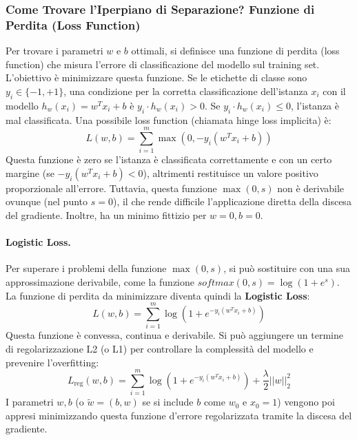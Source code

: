 \documentclass{article}
\begin{document}
\subsubsection{Come Trovare l'Iperpiano di Separazione? Funzione di Perdita (Loss Function)}
Per trovare i parametri $w$ e $b$ ottimali, si definisce una funzione di perdita (loss function) che misura l'errore di classificazione del modello sul training set. L'obiettivo è minimizzare questa funzione.
Se le etichette di classe sono $y_i \in \{-1, +1\}$, una condizione per la corretta classificazione dell'istanza $x_i$ con il modello $h_w(x_i) = w^T x_i + b$ è $y_i \cdot h_w(x_i) > 0$.  Se $y_i \cdot h_w(x_i) \le 0$, l'istanza è mal classificata.
Una possibile loss function (chiamata hinge loss implicita) è:
$$ L(w,b) = \sum_{i=1}^{m} \max(0, -y_i (w^T x_i + b)) $$
Questa funzione è zero se l'istanza è classificata correttamente e con un certo margine (se $-y_i (w^T x_i + b) < 0$), altrimenti restituisce un valore positivo proporzionale all'errore.
Tuttavia, questa funzione $\max(0,s)$ non è derivabile ovunque (nel punto $s=0$), il che rende difficile l'applicazione diretta della discesa del gradiente. Inoltre, ha un minimo fittizio per $w=0, b=0$.

\paragraph{Logistic Loss.}
Per superare i problemi della funzione $\max(0,s)$, si può sostituire con una sua approssimazione derivabile, come la funzione $softmax(0,s) = \log(1+e^s)$. La funzione di perdita da minimizzare diventa quindi la \textbf{Logistic Loss}:
$$ L(w,b) = \sum_{i=1}^{m} \log(1 + e^{-y_i (w^T x_i + b)}) $$
Questa funzione è convessa, continua e derivabile.  Si può aggiungere un termine di regolarizzazione L2 (o L1) per controllare la complessità del modello e prevenire l'overfitting:
$$ L_{\text{reg}}(w,b) = \sum_{i=1}^{m} \log(1 + e^{-y_i (w^T x_i + b)}) + \frac{\lambda}{2} ||w||_2^2 $$
I parametri $w, b$ (o $\tilde{w} = (b, w)$ se si include $b$ come $w_0$ e $x_0=1$) vengono poi appresi minimizzando questa funzione d'errore regolarizzata tramite la discesa del gradiente.
\end{document}
